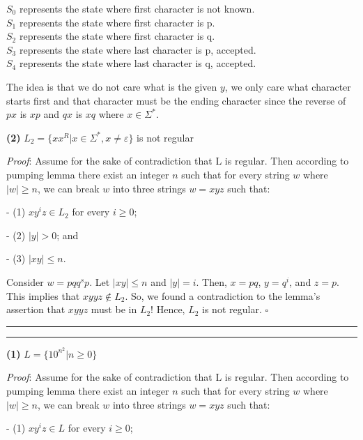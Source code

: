 \documentclass[a4paper, 11pt]{article}
\newcommand{\question}[2] {\vspace{.25in} \hrule\vspace{0.5em}
	\noindent{\bf #1: #2} \vspace{0.5em}
	\hrule \vspace{.10in}}
\renewcommand{\part}[1] {\vspace{.10in} {\bf (#1)}}
\begin{document}
	$S_0$ represents the state where first character is not known.\\
	$S_1$ represents the state where first character is p.\\
	$S_2$ represents the state where first character is q.\\
	$S_3$ represents the state where last character is p, accepted.\\
	$S_4$ represents the state where last character is q, accepted.
	
	The idea is that we do not care what is the given $y$, we only care what character starts first and that character must be the ending character since the reverse of $px$ is $xp$ and $qx$ is $xq$ where $x \in \Sigma^*$.
	
	\part{2} $L_2 = \{xx^R | x \in \Sigma^*, x \neq \varepsilon\}$ is not regular
	
	{\em Proof}: %
	Assume for the sake of contradiction that L is regular. Then according to pumping lemma there exist an integer $n$ such that for every string $w$ where $|w| \geq n$, we can break $w$ into three strings $w = xyz$ such that:
	
	-   (1) $xy^iz \in L_2$ for every $i \geq 0$;
	
	-	(2) $|y| > 0$; and
	
	-	(3) $|xy| \leq n$.
	
	Consider $w = pqq^sp$. Let $|xy| \leq n$ and $|y| = i$. Then, $x = pq$, $y = q^i$, and $z = p$. This implies that $xyyz \notin L_2$. So, we found a contradiction to the lemma’s assertion that $xyyz$ must be in $L_2$! Hence, $L_2$ is not regular. $\square$
	
	
	\question{3}{Nonregular}
	
	\part{1} $L = \{10^{n^2} | n \geq 0\}$ %
	
	{\em Proof}: %
	Assume for the sake of contradiction that L is regular. Then according to pumping lemma there exist an integer $n$ such that for every string $w$ where $|w| \geq n$, we can break $w$ into three strings $w = xyz$ such that:
	
	-   (1) $xy^iz \in L$ for every $i \geq 0$;
		
\end{document}
